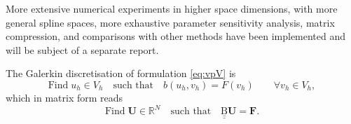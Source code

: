 \documentclass[a4paper]{article}
\theoremstyle{plain}
\theoremstyle{definition}
\newcommand{\vect}[1]{\bm{#1}}
\newcommand{\mat}[1]{\underline{\underline{\mathrm{#1}}}}
\newcommand{\R}{\mathbb{R}}
\begin{document}
More extensive numerical experiments in higher space dimensions, with more general spline spaces, more exhaustive parameter sensitivity analysis, matrix compression, and comparisons with other methods have been implemented and will be subject of a separate report.

The Galerkin discretisation of formulation \eqref{eq:vpV} is
\begin{equation}
	\text{Find}\;u_h\in V_h \quad \text{such that}\quad b(u_h, v_h) = F(v_h) \qquad \forall v_h \in V_h,
	\label{eq:hGalerkin}
\end{equation}
which in matrix form reads
\begin{equation}
	\text{Find}\;\vect U\in\R^N \quad \text{such that}\quad \mat B \vect U = \vect{F}.
	\label{eq:matGalerkin}
\end{equation}
\end{document}
